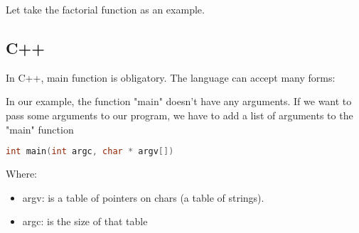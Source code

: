 \documentclass{KodeBook}
\begin{document}
Let take the factorial function as an example. 


\subsection{C++}

In C++, main function is obligatory. 
The language can accept many forms: 




%

In our example, the function "main" doesn't have any arguments. 
If we want to pass some arguments to our program, we have to add a list of arguments to the "main" function
%
\begin{lstlisting}[language=C++, style=codeStyle]
int main(int argc, char * argv[])
\end{lstlisting}
Where:
\begin{itemize}
	\item argv: is a table of pointers on chars (a table of strings).
	\item argc: is the size of that table
\end{itemize}

%
%
%
%
%
%
%
%
%
%
%
%
%
%
%
%
%
%
%
\end{document}

